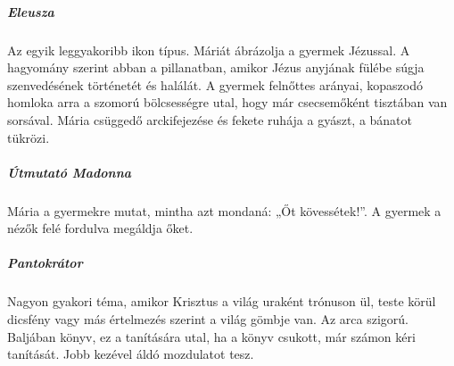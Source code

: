 	
	\begin{figure}[H]
		\centering
		\begin{minipage}{0.2\textwidth}
		\end{minipage}
		\hfill
		\begin{minipage}{0.22\textwidth}
			
		\end{minipage}
		\hfill
		\begin{minipage}{0.25\textwidth}
			
		\end{minipage}
		\hfill
		\begin{minipage}{0.22\textwidth}
			
		\end{minipage}
	\end{figure}
	

	\subparagraph{Eleusza}
	Az egyik leggyakoribb ikon típus. Máriát ábrázolja a gyermek Jézussal. A hagyomány szerint abban a pillanatban, amikor Jézus anyjának fülébe súgja szenvedésének történetét és halálát. A gyermek felnőttes arányai, kopaszodó homloka arra a szomorú bölcsességre utal, hogy már csecsemőként tisztában van sorsával. Mária csüggedő arckifejezése és fekete ruhája a gyászt, a bánatot tükrözi.
	
	\subparagraph{Útmutató Madonna}
	Mária a gyermekre mutat, mintha azt mondaná: „Őt kövessétek!”. A gyermek a nézők felé fordulva megáldja őket.
	
	\subparagraph{Pantokrátor}
	Nagyon gyakori téma, amikor Krisztus a világ uraként trónuson ül, teste körül dicsfény vagy más értelmezés szerint a világ gömbje van. Az arca szigorú. Baljában könyv, ez a tanítására utal, ha a könyv csukott, már számon kéri tanítását. Jobb kezével áldó mozdulatot tesz.
	
